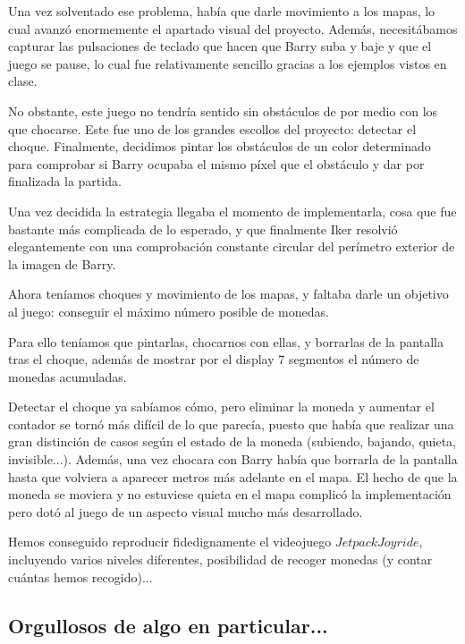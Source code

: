 \documentclass[11pt, a4paper, spanish, openright, twoside]{book}
\begin{document}

Una vez solventado ese problema, había que darle movimiento a los mapas, lo cual avanzó enormemente el apartado visual del proyecto.
Además, necesitábamos capturar las pulsaciones de teclado que hacen que Barry suba y baje y que el juego se pause, lo cual fue relativamente sencillo gracias a los ejemplos vistos en clase.


No obstante, este juego no tendría sentido sin obstáculos de por medio con los que chocarse.
Este fue uno de los grandes escollos del proyecto: detectar el choque.
Finalmente, decidimos pintar los obstáculos de un color determinado para comprobar si Barry ocupaba el mismo píxel que el obstáculo y dar por finalizada la partida.

Una vez decidida la estrategia llegaba el momento de implementarla, cosa que fue bastante más complicada de lo esperado, y que finalmente Iker resolvió elegantemente con una comprobación constante circular del perímetro exterior de la imagen de Barry.

Ahora teníamos choques y movimiento de los mapas, y faltaba darle un objetivo al juego: conseguir el máximo número posible de monedas.

Para ello teníamos que pintarlas, chocarnos con ellas, y borrarlas de la pantalla tras el choque, además de mostrar por el display 7 segmentos el número de monedas acumuladas.

Detectar el choque ya sabíamos cómo, pero eliminar la moneda y aumentar el contador se tornó más difícil de lo que parecía, puesto que había que realizar una gran distinción de casos según el estado de la moneda (subiendo, bajando, quieta, invisible...). Además, una vez chocara con Barry había que borrarla de la pantalla hasta que volviera a aparecer metros más adelante en el mapa. El hecho de que la moneda se moviera y no estuviese quieta en el mapa complicó la implementación pero dotó al juego de un aspecto visual mucho más desarrollado.



Hemos conseguido reproducir fidedignamente el videojuego $Jetpack Joyride$, incluyendo varios niveles diferentes, posibilidad de recoger monedas (y contar cuántas hemos recogido)...

\subsection{Orgullosos de algo en particular...}
\end{document}
